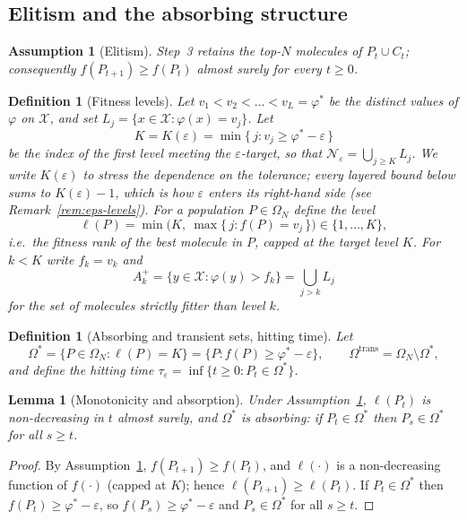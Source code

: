\documentclass[11pt,a4paper]{article}
\newtheorem{lemma}[theorem]{Lemma}
\newtheorem{definition}[theorem]{Definition}
\newtheorem{assumption}{Assumption}   %
\newcommand{\X}{\mathcal{X}}
\newcommand{\Omn}{\Omega_N}
\newcommand{\Oms}{\Omega^*}
\newcommand{\Omt}{\Omega^{\mathrm{trans}}}
\newcommand{\phist}{\varphi^*}
\newcommand{\Neps}{\mathcal{N}_\varepsilon}
\newcommand{\Akp}{A_k^{+}}
\begin{document}
\subsection{Elitism and the absorbing structure}

\begin{assumption}[Elitism]\label{ass:elitism}
  Step~3 retains the top-$N$ molecules of $P_t\cup C_t$; consequently
  $f(P_{t+1})\ge f(P_t)$ almost surely for every $t\ge0$.
\end{assumption}

\begin{definition}[Fitness levels]\label{def:levels}
  Let $v_1<v_2<\dots<v_L=\phist$ be the distinct values of $\varphi$ on
  $\X$, and set $L_j=\{x\in\X:\varphi(x)=v_j\}$.  Let
  \[
    K=K(\varepsilon)=\min\{\,j : v_j\ge\phist-\varepsilon\,\}
  \]
  be the index of the first level meeting the $\varepsilon$-target, so
  that $\Neps=\bigcup_{j\ge K}L_j$.  We write $K(\varepsilon)$ to stress
  the dependence on the tolerance; every layered bound below sums to
  $K(\varepsilon)-1$, which is how $\varepsilon$ enters its right-hand side
  (see Remark~\ref{rem:eps-levels}).  For a population $P\in\Omn$ define
  the \emph{level}
  \[
    \ell(P)=\min\bigl(K,\ \max\{\,j : f(P)=v_j\,\}\bigr)\in\{1,\dots,K\},
  \]
  i.e.\ the fitness rank of the best molecule in $P$, capped at the
  target level $K$.  For $k<K$ write $f_k=v_k$ and
  \[
    \Akp=\{y\in\X:\varphi(y)>f_k\}=\bigcup_{j>k}L_j
  \]
  for the set of molecules strictly fitter than level $k$.
\end{definition}

\begin{definition}[Absorbing and transient sets, hitting time]
\label{def:absorbing}
  Let
  \[
    \Oms=\{P\in\Omn:\ell(P)=K\}=\{P:f(P)\ge\phist-\varepsilon\},
    \qquad
    \Omt=\Omn\setminus\Oms,
  \]
  and define the \emph{hitting time}
  $\tau_\varepsilon=\inf\{t\ge0:P_t\in\Oms\}$.
\end{definition}

\begin{lemma}[Monotonicity and absorption]\label{lem:monotone}
  Under Assumption~\ref{ass:elitism}, $\ell(P_t)$ is non-decreasing in
  $t$ almost surely, and $\Oms$ is absorbing: if $P_t\in\Oms$ then
  $P_{s}\in\Oms$ for all $s\ge t$.
\end{lemma}

\begin{proof}
  By Assumption~\ref{ass:elitism}, $f(P_{t+1})\ge f(P_t)$, and
  $\ell(\cdot)$ is a non-decreasing function of $f(\cdot)$ (capped at
  $K$); hence $\ell(P_{t+1})\ge\ell(P_t)$.  If $P_t\in\Oms$ then
  $f(P_t)\ge\phist-\varepsilon$, so $f(P_s)\ge\phist-\varepsilon$ and
  $P_s\in\Oms$ for all $s\ge t$.
\end{proof}
\end{document}
